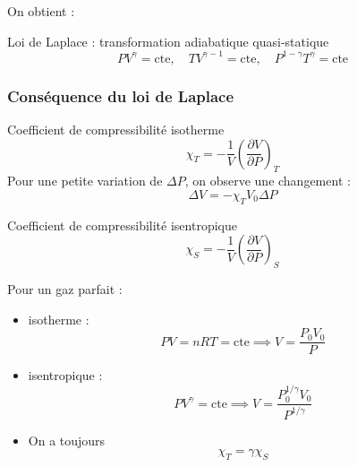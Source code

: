     On obtient :
    \begin{Theorem}{
        Loi de Laplace : transformation adiabatique quasi-statique
      }{}
    \begin{equation}
      PV ^\gamma = \text{cte}, \quad TV ^{\gamma-1} = \text{cte}, \quad P ^{1-\gamma} T ^\gamma = \text{cte}
    \end{equation}
    \end{Theorem}


    \subsubsection{Conséquence du loi de Laplace} %
    \label{sec:Conséquence du loi de Laplace}
   \begin{Definition}[colbacktitle=red!75!black]{Coefficient de compressibilité isotherme}{}
   \begin{equation}
     \chi_T = - \frac{1}{V}  \left( \frac{\partial V}{\partial P}  \right)_T
   \end{equation}
   Pour une petite variation de $\Delta P$, on observe une changement : 
   \begin{equation}
     \Delta V = - \chi_T V_0 \Delta P
   \end{equation}
   \end{Definition}

   \begin{Definition}[colbacktitle=red!75!black]{
       Coefficient de compressibilité isentropique
     }{}
   \begin{equation}
     \chi_S = - \frac{1}{V}  \left( \frac{\partial V}{\partial P}  \right)_S
   \end{equation}
   \end{Definition}

   
   Pour un gaz parfait : 
   \begin{itemize}

       \item isotherme : 
         \begin{equation}
           PV = nRT= \text{cte} \implies V = \frac{P_0 V_0}{P}         
         \end{equation}

       \item isentropique : 
         \begin{equation}
           PV ^{\gamma} = \text{cte} \implies V = \frac{P_0 ^{1/ \gamma}V_0}{P ^{1/\gamma}} 
         \end{equation}

        \item On a toujours 
          \begin{equation}
            \chi_T = \gamma \chi_S
          \end{equation}

   \end{itemize}

    


